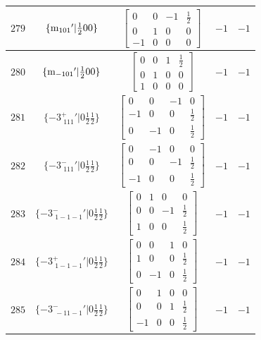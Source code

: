 \documentclass[fleqn,8pt]{jsarticle}
\begin{document}
\begin{longtable}{ccccc}
$ 279 $ & $ \{{\rm m}_{101}{}'|\frac{1}{2} 0 0\} $ & $ \begin{bmatrix} 0 & 0 & -1 & \frac{1}{2} \\ 0 & 1 & 0 & 0 \\ -1 & 0 & 0 & 0 \end{bmatrix} $ & $ -1 $ & $ -1 $ \\ \hline
$ 280 $ & $ \{{\rm m}_{-101}{}'|\frac{1}{2} 0 0\} $ & $ \begin{bmatrix} 0 & 0 & 1 & \frac{1}{2} \\ 0 & 1 & 0 & 0 \\ 1 & 0 & 0 & 0 \end{bmatrix} $ & $ -1 $ & $ -1 $ \\ \hline
$ 281 $ & $ \{-3^{+}_{\,\,111}{}'|0 \frac{1}{2} \frac{1}{2}\} $ & $ \begin{bmatrix} 0 & 0 & -1 & 0 \\ -1 & 0 & 0 & \frac{1}{2} \\ 0 & -1 & 0 & \frac{1}{2} \end{bmatrix} $ & $ -1 $ & $ -1 $ \\ \hline
$ 282 $ & $ \{-3^{-}_{\,\,111}{}'|0 \frac{1}{2} \frac{1}{2}\} $ & $ \begin{bmatrix} 0 & -1 & 0 & 0 \\ 0 & 0 & -1 & \frac{1}{2} \\ -1 & 0 & 0 & \frac{1}{2} \end{bmatrix} $ & $ -1 $ & $ -1 $ \\ \hline
$ 283 $ & $ \{-3^{-}_{\,\,1-1-1}{}'|0 \frac{1}{2} \frac{1}{2}\} $ & $ \begin{bmatrix} 0 & 1 & 0 & 0 \\ 0 & 0 & -1 & \frac{1}{2} \\ 1 & 0 & 0 & \frac{1}{2} \end{bmatrix} $ & $ -1 $ & $ -1 $ \\ \hline
$ 284 $ & $ \{-3^{+}_{\,\,1-1-1}{}'|0 \frac{1}{2} \frac{1}{2}\} $ & $ \begin{bmatrix} 0 & 0 & 1 & 0 \\ 1 & 0 & 0 & \frac{1}{2} \\ 0 & -1 & 0 & \frac{1}{2} \end{bmatrix} $ & $ -1 $ & $ -1 $ \\ \hline
$ 285 $ & $ \{-3^{-}_{\,\,-11-1}{}'|0 \frac{1}{2} \frac{1}{2}\} $ & $ \begin{bmatrix} 0 & 1 & 0 & 0 \\ 0 & 0 & 1 & \frac{1}{2} \\ -1 & 0 & 0 & \frac{1}{2} \end{bmatrix} $ & $ -1 $ & $ -1 $ \\ \hline

\end{longtable}
\end{document}
